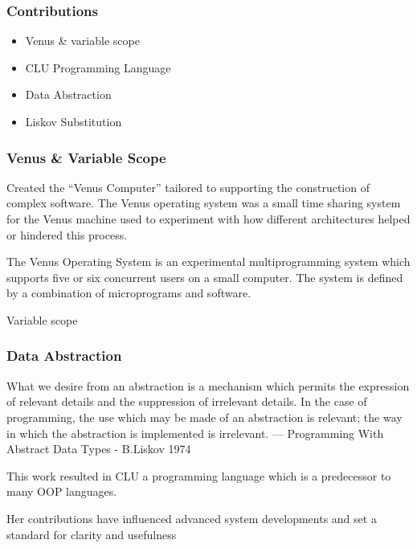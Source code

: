 \documentclass{beamer}
\begin{document}
\begin{frame}
\frametitle{Contributions}
\begin{itemize}
\item Venus \& variable scope
\item CLU Programming Language
\item Data Abstraction
\item Liskov Substitution
\end{itemize}
\end{frame}
\begin{frame}
\frametitle{Venus \& Variable Scope}
Created the “Venus Computer” tailored to supporting the construction of complex software. The Venus operating system was a small time sharing system for the Venus machine used to experiment with how different architectures helped or hindered this process.

\vspace{5mm}

The Venus Operating System is an experimental multiprogramming system which supports five or six concurrent users on a small computer. The system is defined by a combination of microprograms and software.

\vspace{5mm}

Variable scope
\end{frame}
\begin{frame}
\frametitle{Data Abstraction}
What we desire from an abstraction is a mechanism which permits the expression of relevant details and the suppression of irrelevant details. In the case of programming, the use which may be made of an abstraction is relevant; the way in which the abstraction is implemented is irrelevant. — Programming With Abstract Data Types - B.Liskov 1974

This work resulted in CLU a programming language which is a predecessor to many OOP languages.
\vspace{5mm}

Her contributions have influenced advanced system developments and set a standard for clarity and usefulness

\end{frame}
\end{document}
